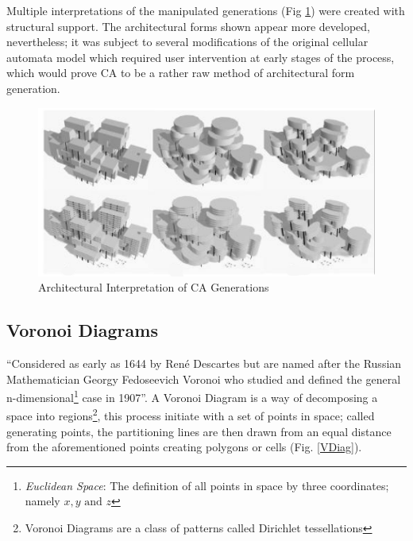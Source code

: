 Multiple interpretations of the manipulated generations (Fig \ref{CA ArchForm}) were created with structural support. The architectural forms shown appear more developed, nevertheless; it was subject to several modifications of the original cellular automata model which required user intervention at early stages of the process, which would prove CA to be a rather raw method of architectural form generation.

\begin{figure}[H]
\centering
\includegraphics[width=\textwidth]{./Images/5-3dCASpaces}
\caption[Architectural Interpretation of CA Generations]{Architectural Interpretation of CA Generations \cite{krawczyk02}}
\label{CA ArchForm}
\end{figure}

\clearpage
\subsection{Voronoi Diagrams}

``Considered as early as 1644 by Ren\'{e} Descartes but are named after the Russian Mathematician Georgy Fedoseevich Voronoi who studied and defined the general n-dimensional\footnote{\emph{Euclidean Space}: The definition of all points in space by three coordinates; namely $x,y \text{ and } z$} case in 1907''\cite{fasoulaki08}. A Voronoi Diagram is a way of decomposing a space into regions\footnote{Voronoi Diagrams are a class of patterns called Dirichlet tessellations}, this process initiate with a set of points in space; called generating points, the partitioning lines are then drawn from an equal distance from the aforementioned points creating polygons or cells (Fig. \ref{VDiag}).

